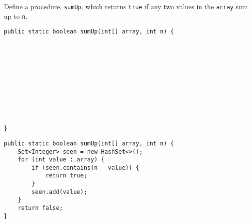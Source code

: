 \begin{blocksection}
\question Define a procedure, \lstinline$sumUp$, which returns \lstinline$true$
if any two values in the \lstinline$array$ sum up to \lstinline$n$.

\ifprintanswers\else
\begin{lstlisting}
public static boolean sumUp(int[] array, int n) {











}
\end{lstlisting}
\fi

\begin{solution}
\begin{lstlisting}
public static boolean sumUp(int[] array, int n) {
    Set<Integer> seen = new HashSet<>();
    for (int value : array) {
        if (seen.contains(n - value)) {
            return true;
        }
        seen.add(value);
    }
    return false;
}
\end{lstlisting}
\end{solution}
\end{blocksection}
